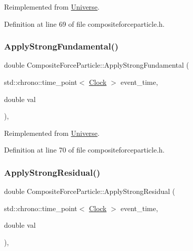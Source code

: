 Reimplemented from \mbox{\hyperlink{class_universe_a906a88b37f10bfa630bef49dfd0e907a}{Universe}}.



Definition at line 69 of file compositeforceparticle.\+h.

\mbox{\label{class_composite_force_particle_a64fe19ee12d6ca0a69f650faa5bedb58}} 
\subsubsection{\texorpdfstring{Apply\+Strong\+Fundamental()}{ApplyStrongFundamental()}}
{\footnotesize\ttfamily double Composite\+Force\+Particle\+::\+Apply\+Strong\+Fundamental (\begin{DoxyParamCaption}\item[{std\+::chrono\+::time\+\_\+point$<$ \mbox{\hyperlink{universe_8h_a0ef8d951d1ca5ab3cfaf7ab4c7a6fd80}{Clock}} $>$}]{event\+\_\+time,  }\item[{double}]{val }\end{DoxyParamCaption})\hspace{0.3cm}{\ttfamily [inline]}, {\ttfamily [virtual]}}



Reimplemented from \mbox{\hyperlink{class_universe_a62789bcff84bd750b0366004381e2fdd}{Universe}}.



Definition at line 70 of file compositeforceparticle.\+h.

\mbox{\label{class_composite_force_particle_ae0937405e68dd40b19036d5a359f7e07}} 
\subsubsection{\texorpdfstring{Apply\+Strong\+Residual()}{ApplyStrongResidual()}}
{\footnotesize\ttfamily double Composite\+Force\+Particle\+::\+Apply\+Strong\+Residual (\begin{DoxyParamCaption}\item[{std\+::chrono\+::time\+\_\+point$<$ \mbox{\hyperlink{universe_8h_a0ef8d951d1ca5ab3cfaf7ab4c7a6fd80}{Clock}} $>$}]{event\+\_\+time,  }\item[{double}]{val }\end{DoxyParamCaption})\hspace{0.3cm}{\ttfamily [inline]}, {\ttfamily [virtual]}}



